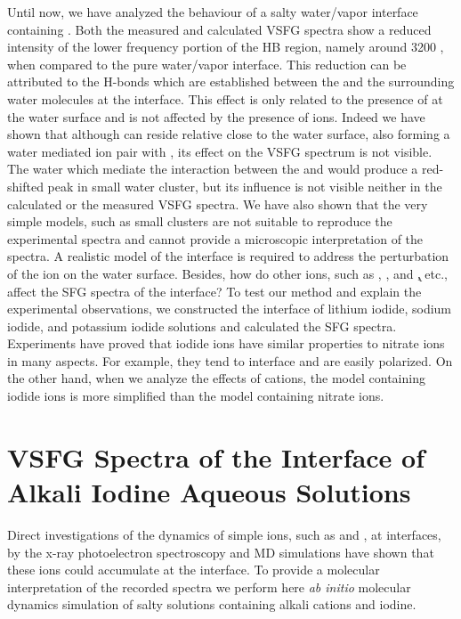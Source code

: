 Until now, we have analyzed the behaviour of a salty water/vapor interface containing \LiN.
Both the measured and calculated VSFG spectra show a reduced intensity of the lower frequency portion of
the HB region, namely around 3200 \centimeter, when compared to the pure water/vapor interface. 
This reduction can be attributed to the H-bonds which are established between the \nitrate and the surrounding water molecules at the interface.
This effect is only related to the presence of \nitrate at the water surface and is not affected by the presence of \Li ions.
Indeed we have shown that although \Li can reside relative close to the water surface, also forming a water mediated
ion pair with \nit, its effect on the VSFG spectrum is not visible. The water which mediate the interaction 
between the \nitrate and \Li would produce a red-shifted peak in small water cluster, but its influence is not visible 
neither in the calculated or the measured VSFG spectra. We have also shown that the very simple models,
such as small clusters are not suitable to reproduce the experimental spectra and cannot provide a microscopic interpretation of the spectra. 
A realistic model of the interface is required to address the perturbation of the ion on the water surface.
Besides, how do other ions, such as \li, \na, and \k, etc., affect the SFG spectra of the interface? 
To test our method and explain the experimental observations, we constructed the interface of lithium iodide,
 sodium iodide, and potassium iodide solutions and calculated the SFG spectra. 
Experiments have proved that iodide ions have similar properties to nitrate ions in many aspects. 
For example, they tend to interface and are easily polarized. 
On the other hand, when we analyze the effects of cations, the model containing iodide ions is more simplified than the model containing nitrate ions.

\section{VSFG Spectra of the Interface of Alkali Iodine Aqueous Solutions}\label{sfg_alkali_iodide_interface} %
Direct investigations of the dynamics of simple ions, such as \I and \br, at interfaces, 
by the x-ray photoelectron spectroscopy \cite{ghosal2005} and MD simulations \cite{PJ01,PJ02} 
have shown that these ions could accumulate at the interface.
To provide a molecular interpretation of the recorded spectra we perform here \emph{ab initio} molecular dynamics simulation of salty solutions containing alkali cations
and iodine. %

